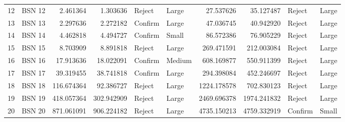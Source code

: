 \begin{tabular}{llrrllrrll}
12 &  BSN 12 &           2.461364 &            1.303636 &   Reject &       Large &                27.537626 &                 35.127487 &   Reject &       Large \\
13 &  BSN 13 &           2.297636 &            2.272182 &  Confirm &       Large &                47.036745 &                 40.942920 &   Reject &       Large \\
14 &  BSN 14 &           4.462818 &            4.494727 &  Confirm &       Small &                86.572386 &                 76.905229 &   Reject &       Large \\
15 &  BSN 15 &           8.703909 &            8.891818 &   Reject &       Large &               269.471591 &                212.003084 &   Reject &       Large \\
16 &  BSN 16 &          17.913636 &           18.022091 &  Confirm &      Medium &               608.169877 &                550.911399 &   Reject &       Large \\
17 &  BSN 17 &          39.319455 &           38.741818 &  Confirm &       Large &               294.398084 &                452.246697 &   Reject &       Large \\
18 &  BSN 18 &         116.674364 &           92.386727 &   Reject &       Large &              1224.178578 &                702.830123 &   Reject &       Large \\
19 &  BSN 19 &         418.057364 &          302.942909 &   Reject &       Large &              2469.696378 &               1974.241832 &   Reject &       Large \\
20 &  BSN 20 &         871.061091 &          906.224182 &   Reject &       Large &              4735.150213 &               4759.332919 &  Confirm &       Small \\
\bottomrule
\end{tabular}
